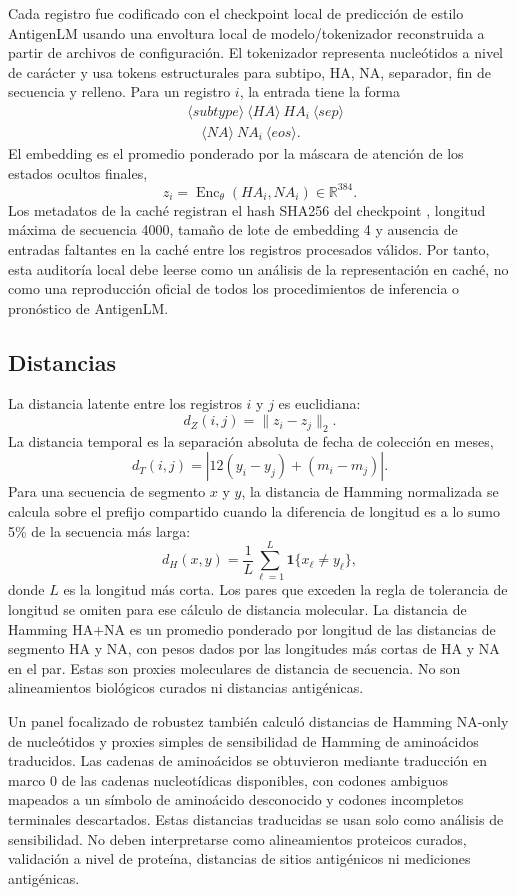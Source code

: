 \documentclass[11pt]{article}
\newcommand{\Enc}{\operatorname{Enc}}
\newcommand{\R}{\mathbb{R}}
\begin{document}
Cada registro fue codificado con el checkpoint local de predicción de estilo AntigenLM  usando una envoltura local de modelo/tokenizador reconstruida a partir de archivos de configuración. El tokenizador representa nucleótidos a nivel de carácter y usa tokens estructurales para subtipo, HA, NA, separador, fin de secuencia y relleno. Para un registro $i$, la entrada tiene la forma
\[
\begin{aligned}
&\langle subtype\rangle \ \langle HA\rangle \ HA_i \ \langle sep\rangle \\
&\quad \langle NA\rangle \ NA_i \ \langle eos\rangle .
\end{aligned}
\]
El embedding es el promedio ponderado por la máscara de atención de los estados ocultos finales,
\[
z_i=\Enc_{\theta}(HA_i,NA_i)\in\R^{384}.
\]
Los metadatos de la caché registran el hash SHA256 del checkpoint
, longitud máxima de secuencia 4000, tamaño de lote de embedding 4 y ausencia de entradas faltantes en la caché entre los registros procesados válidos. Por tanto, esta auditoría local debe leerse como un análisis de la representación en caché, no como una reproducción oficial de todos los procedimientos de inferencia o pronóstico de AntigenLM.

\subsection{Distancias}

La distancia latente entre los registros $i$ y $j$ es euclidiana:
\[
d_Z(i,j)=\lVert z_i-z_j\rVert_2.
\]
La distancia temporal es la separación absoluta de fecha de colección en meses,
\[
d_T(i,j)=\left|12(y_i-y_j)+(m_i-m_j)\right|.
\]
Para una secuencia de segmento $x$ y $y$, la distancia de Hamming normalizada se calcula sobre el prefijo compartido cuando la diferencia de longitud es a lo sumo 5\% de la secuencia más larga:
\[
d_H(x,y)=\frac{1}{L}\sum_{\ell=1}^{L}\mathbf{1}\{x_\ell\neq y_\ell\},
\]
donde $L$ es la longitud más corta. Los pares que exceden la regla de tolerancia de longitud se omiten para ese cálculo de distancia molecular. La distancia de Hamming HA+NA es un promedio ponderado por longitud de las distancias de segmento HA y NA, con pesos dados por las longitudes más cortas de HA y NA en el par. Estas son proxies moleculares de distancia de secuencia. No son alineamientos biológicos curados ni distancias antigénicas.

Un panel focalizado de robustez también calculó distancias de Hamming NA-only de nucleótidos y proxies simples de sensibilidad de Hamming de aminoácidos traducidos. Las cadenas de aminoácidos se obtuvieron mediante traducción en marco 0 de las cadenas nucleotídicas disponibles, con codones ambiguos mapeados a un símbolo de aminoácido desconocido y codones incompletos terminales descartados. Estas distancias traducidas se usan solo como análisis de sensibilidad. No deben interpretarse como alineamientos proteicos curados, validación a nivel de proteína, distancias de sitios antigénicos ni mediciones antigénicas.
\end{document}
